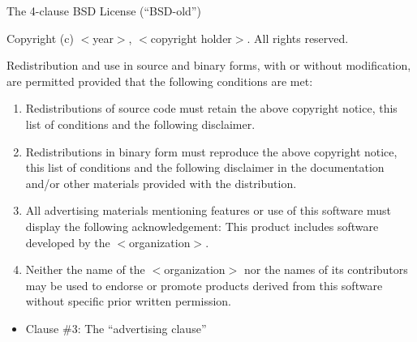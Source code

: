 \documentclass{beamer}
\begin{document}
\begin{frame}

\begin{block}{The 4-clause BSD License (``BSD-old'')} 

\footnotesize
  
Copyright (c) $<$year$>$, $<$copyright holder$>$. All rights reserved.

Redistribution and use in source and binary forms, with or without
modification, are permitted provided that the following conditions are met:
\begin{enumerate}
\item Redistributions of source code must retain the above copyright
   notice, this list of conditions and the following disclaimer.
\item Redistributions in binary form must reproduce the above copyright
   notice, this list of conditions and the following disclaimer in the
   documentation and/or other materials provided with the distribution.
\item \alert{All advertising materials mentioning features or use of this software
   must display the following acknowledgement:
   This product includes software developed by the $<$organization$>$.}
\item Neither the name of the $<$organization$>$ nor the
   names of its contributors may be used to endorse or promote products
   derived from this software without specific prior written permission.
\end{enumerate}

\end{block}

\begin{itemize}
  \item Clause \#3: \alert{The ``advertising clause''}
\end{itemize}

\end{frame}

\end{document}
